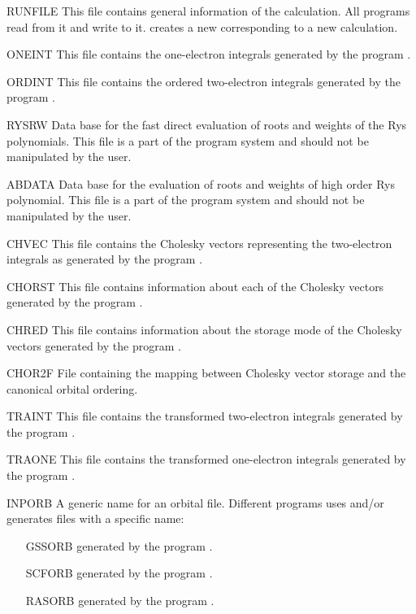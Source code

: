 \begin{filelist}
\item[RUNFILE]
This file contains general information of the calculation. All programs
read from it and write to it.  creates a new 
corresponding to a new calculation.
\item[ONEINT]
This file contains the one-electron integrals generated by the program
.
\item[ORDINT]
This file contains the ordered two-electron integrals generated by the program
.
\item[RYSRW]
Data base for the fast direct evaluation of roots and weights of
the Rys polynomials. This file is a part of the program system and
should not be manipulated by the user.
\item[ABDATA]
Data base for the evaluation of roots and weights of high order Rys
polynomial. This file is a part of the program system and should
not be manipulated by the user.
\item[CHVEC]
This file contains the Cholesky vectors representing the two-electron integrals
as generated by the program
.
\item[CHORST]
This file contains information about each of the Cholesky
vectors generated by the program
.
\item[CHRED]
This file contains information about the storage mode of the Cholesky
vectors generated by the program
.
\item[CHOR2F]
File containing the mapping between Cholesky vector storage and the canonical orbital ordering.
\item[TRAINT]
This file contains the transformed two-electron integrals generated
by the program
.
\item[TRAONE]
This file contains the transformed one-electron integrals generated by
the program
.
\item[INPORB] A generic name for an orbital file. Different programs
uses and/or generates  files with a specific name:
\begin{itemize}
\item[GSSORB] generated by the program .
\item[SCFORB] generated by the program .
\item[RASORB] generated by the program .

\end{itemize}
\end{filelist}
